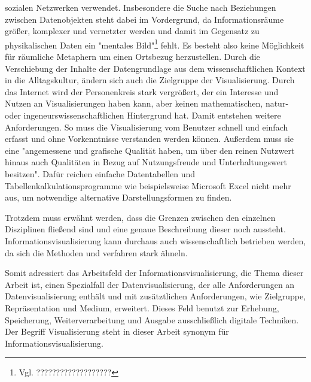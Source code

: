 \documentclass[a4paper, 12pt, DIVcalc, onepage, pdftex, headsepline, footsepline]{scrreprt}
\begin{document}
sozialen Netzwerken verwendet.
Insbesondere die Suche nach Beziehungen zwischen Datenobjekten steht dabei im Vordergrund,
da Informationsräume größer, komplexer und vernetzter werden und damit im Gegensatz
zu physikalischen Daten ein "mentales Bild"\footnote{Vgl. ???????????????????} fehlt.
Es besteht also keine Möglichkeit für räumliche Metaphern um einen Ortsbezug herzustellen.
Durch die Verschiebung der Inhalte der Datengrundlage aus dem wissenschaftlichen Kontext
in die Alltagskultur, ändern sich auch die Zielgruppe der Visualisierung. Durch das Internet
wird der Personenkreis stark vergrößert, der ein Interesse und Nutzen an Visualisierungen
haben kann, aber keinen mathematischen, natur- oder ingeneurswissenschaftlichen Hintergrund
hat. Damit entstehen weitere Anforderungen. So muss die Visualisierung vom Benutzer
schnell und einfach erfasst und ohne Vorkenntnisse verstanden werden können.
Außerdem muss sie eine "angemessene und grafische Qualität haben, um über den
reinen Nutzwert hinaus auch Qualitäten in Bezug auf Nutzungsfreude und Unterhaltungswert besitzen".\citep[S.\,438]{Preim}
Dafür reichen einfache Datentabellen und Tabellenkalkulationsprogramme wie beispielsweise Microsoft Excel
nicht mehr aus, um notwendige alternative Darstellungsformen zu finden.

Trotzdem muss erwähnt werden, dass die Grenzen zwischen den einzelnen Disziplinen fließend sind
und eine genaue Beschreibung dieser noch aussteht. Informationsvisualisierung kann durchaus
auch wissenschaftlich betrieben werden, da sich die Methoden und verfahren stark ähneln.

Somit adressiert das Arbeitsfeld der Informationsvisualisierung, die Thema dieser Arbeit ist,
einen Spezialfall der Datenvisualisierung, der alle Anforderungen an Datenvisualisierung enthält
und mit zusätztlichen Anforderungen, wie Zielgruppe, Repräsentation und Medium, erweitert. Dieses
Feld benutzt zur Erhebung, Speicherung, Weiterverarbeitung und Ausgabe ausschließlich digitale Techniken.
Der Begriff Visualisierung steht in dieser Arbeit synonym für Informationsvisualisierung.
\end{document}
